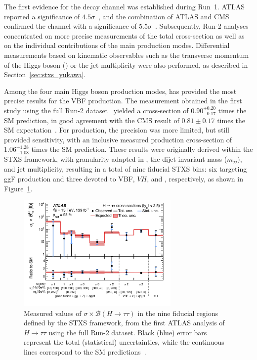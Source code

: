   The first evidence for the \htautau decay channel was established during Run~1. ATLAS reported a significance of $4.5\sigma$~\cite{htau_2015}, and the combination of ATLAS and CMS confirmed the channel with a significance of $5.5\sigma$~\cite{htau_cms_atlas_2016}. Subsequently, Run-2 analyses concentrated on more precise measurements of the total cross-section as well as on the individual contributions of the main production modes. Differential measurements based on kinematic observables such as the transverse momentum of the Higgs boson (\pth) or the jet multiplicity were also performed, as described in Section~\ref{sec:stxs_yukawa}.  
  
  Among the four main Higgs boson production modes, \htautau has provided the most precise results for the VBF production. The measurement obtained in the first study using the full Run-2 dataset~\cite{2022} yielded a cross-section of $0.90^{+0.20}_{-0.17}$ times the SM prediction, in good agreement with the CMS result of $0.81 \pm 0.17$ times the SM expectation~\cite{Tumasyan_2023}. For \ttH production, the precision was more limited, but still provided sensitivity, with an inclusive measured production cross-section of $1.06^{+1.28}_{-1.08}$ times the SM prediction. These results were originally derived within the STXS framework, with granularity adapted in \pth, the dijet invariant mass ($m_{jj}$), and jet multiplicity, resulting in a total of nine fiducial STXS bins: six targeting ggF production and three devoted to VBF, $VH$, and \ttH, respectively, as shown in Figure~\ref{fig:atlas_htautau_stxs}.
  
\begin{figure}[htbp]
    \centering
    \includegraphics[width=0.7\textwidth]{images/pois_9pois.png}
    \caption{Measured values of $\sigma \times \mathcal{B}(H \to \tau\tau)$ in the nine fiducial regions defined by the STXS framework, from the first ATLAS analysis of $H \to \tau\tau$ using the full Run-2 dataset. Black (blue) error bars represent the total (statistical) uncertainties, while the continuous lines correspond to the SM predictions~\cite{2022}.}
    \label{fig:atlas_htautau_stxs}
\end{figure}

